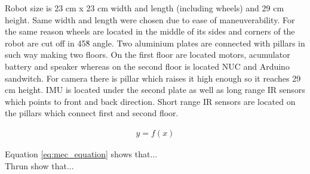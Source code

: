 Robot size is 23 cm x 23 cm width and length (including wheels) and 29 cm height. Same width and length were chosen due to ease of maneuverability. For the same reason wheels are located in the middle of its sides and corners of the robot are cut off in 45\u8 angle. Two aluminium plates are connected with pillars in such way making two floors. On the first floor are located motors, acumulator battery and speaker whereas on the second floor is located NUC and Arduino sandwitch. For camera there is pillar which raises it high enough so it reaches 29 cm height. IMU is located under the second plate as well as long range IR sensors which points to front and back direction. Short range IR sensors are located on the pillars which connect first and second floor.



\begin{align}
\label{eq:mec_equation}
y = f(x)
\end{align}

Equation \ref{eq:mec_equation} shows that...\\
Thrun \etal \cite{Thrun} show that... 


